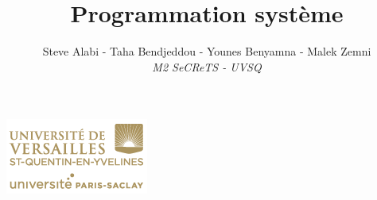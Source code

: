 \documentclass[a4paper,11pt]{article}
\title{\vspace{15em}\textbf{\Huge Programmation système}}
\author{
	Steve Alabi - Taha Bendjeddou - Younes Benyamna - Malek Zemni
	\vspace{2em}\\
	\textit{M2 SeCReTS - UVSQ}
	\vspace{2em}
}
\begin{document}
\clearpage
\maketitle\vspace{15em}
\begin{center}\includegraphics[scale=0.7]{../img/logo.png}\end{center}

\newpage
\tableofcontents

\newpage\clearpage{}

	
		
	
	
	
	
	
	
	
\end{document}
